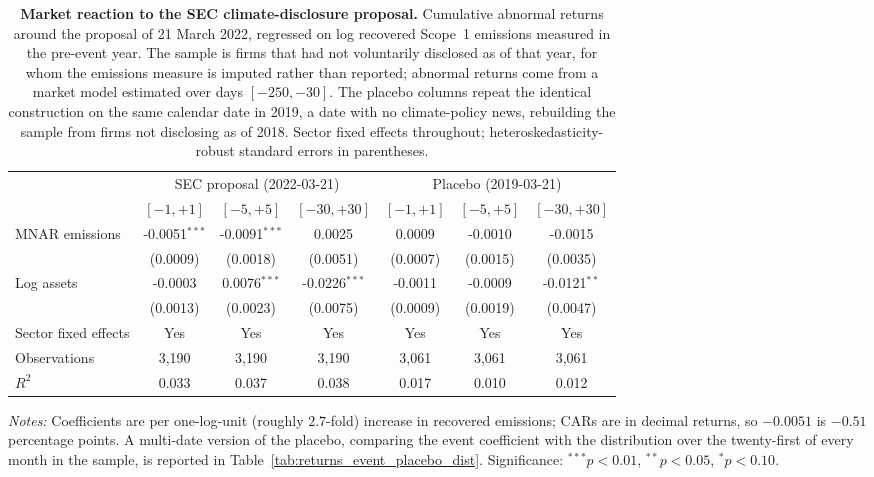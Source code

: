 \documentclass[a4paper,12pt]{article}
\begin{document}
\begin{table}[htbp]
\footnotesize\centering
\caption{\textbf{Market reaction to the SEC climate-disclosure proposal.}
Cumulative abnormal returns around the proposal of 21 March 2022, regressed
on log recovered Scope~1 emissions measured in the pre-event year. The sample
is firms that had not voluntarily disclosed as of that year, for whom the
emissions measure is imputed rather than reported; abnormal returns come from
a market model estimated over days $[-250,-30]$. The placebo columns repeat
the identical construction on the same calendar date in 2019, a date with no
climate-policy news, rebuilding the sample from firms not disclosing as of
2018. Sector fixed effects throughout; heteroskedasticity-robust standard
errors in parentheses.}
\label{tab:returns_event_study}
\begin{tabular}{lcccccc}
\toprule
 & \multicolumn{3}{c}{SEC proposal (2022-03-21)} & \multicolumn{3}{c}{Placebo (2019-03-21)} \\
\cmidrule(lr){2-4}\cmidrule(lr){5-7}
 & $[-1,+1]$ & $[-5,+5]$ & $[-30,+30]$ & $[-1,+1]$ & $[-5,+5]$ & $[-30,+30]$ \\
\midrule
MNAR emissions & -0.0051$^{***}$ & -0.0091$^{***}$ & 0.0025 & 0.0009 & -0.0010 & -0.0015 \\
 & (0.0009) & (0.0018) & (0.0051) & (0.0007) & (0.0015) & (0.0035) \\
Log assets & -0.0003 & 0.0076$^{***}$ & -0.0226$^{***}$ & -0.0011 & -0.0009 & -0.0121$^{**}$ \\
 & (0.0013) & (0.0023) & (0.0075) & (0.0009) & (0.0019) & (0.0047) \\
\midrule
Sector fixed effects & Yes & Yes & Yes & Yes & Yes & Yes \\
Observations & 3,190 & 3,190 & 3,190 & 3,061 & 3,061 & 3,061 \\
$R^2$ & 0.033 & 0.037 & 0.038 & 0.017 & 0.010 & 0.012 \\
\bottomrule
\end{tabular}
\begin{flushleft}\footnotesize
\textit{Notes:} Coefficients are per one-log-unit (roughly $2.7$-fold)
increase in recovered emissions; CARs are in decimal returns, so $-0.0051$
is $-0.51$ percentage points. A multi-date version of the placebo, comparing
the event coefficient with the distribution over the twenty-first of every
month in the sample, is reported in Table~\ref{tab:returns_event_placebo_dist}.
Significance: $^{***}p<0.01$, $^{**}p<0.05$, $^{*}p<0.10$.
\end{flushleft}
\end{table}
\end{document}
